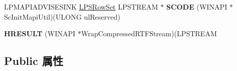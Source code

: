 \begin{DoxyCompactItemize}
\item 
\mbox{\label{struct_m_a_p_i___f_u_n_c_t_i_o_n_s_a85fa3c1fca2991f362d77323658ef4b7}} 
L\+P\+M\+A\+P\+I\+A\+D\+V\+I\+S\+E\+S\+I\+NK \hyperlink{struct___s_row_set}{L\+P\+S\+Row\+Set} L\+P\+S\+T\+R\+E\+AM $\ast$ {\bfseries S\+C\+O\+DE} (W\+I\+N\+A\+PI $\ast$Sc\+Init\+Mapi\+Util)(U\+L\+O\+NG ul\+Reserved)
\item 
\mbox{\label{struct_m_a_p_i___f_u_n_c_t_i_o_n_s_a6b9843b7823ff96717e64d3ca5a4d12a}} 
{\bfseries H\+R\+E\+S\+U\+LT} (W\+I\+N\+A\+PI $\ast$Wrap\+Compressed\+R\+T\+F\+Stream)(L\+P\+S\+T\+R\+E\+AM
\end{DoxyCompactItemize}
\subsection*{Public 属性}
